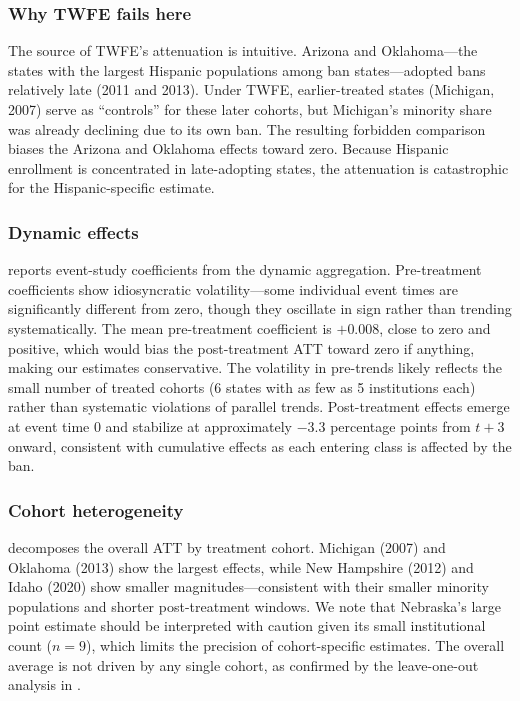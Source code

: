 \documentclass[12pt]{article}
\begin{document}


\subsubsection*{Why TWFE fails here} The source of TWFE's attenuation is intuitive. Arizona and Oklahoma---the states with the largest Hispanic populations among ban states---adopted bans relatively late (2011 and 2013). Under TWFE, earlier-treated states (Michigan, 2007) serve as ``controls'' for these later cohorts, but Michigan's minority share was already declining due to its own ban. The resulting forbidden comparison biases the Arizona and Oklahoma effects toward zero. Because Hispanic enrollment is concentrated in late-adopting states, the attenuation is catastrophic for the Hispanic-specific estimate.

\subsubsection*{Dynamic effects}  reports event-study coefficients from the dynamic aggregation. Pre-treatment coefficients show idiosyncratic volatility---some individual event times are significantly different from zero, though they oscillate in sign rather than trending systematically. The mean pre-treatment coefficient is $+0.008$, close to zero and positive, which would bias the post-treatment ATT toward zero if anything, making our estimates conservative. The volatility in pre-trends likely reflects the small number of treated cohorts (6 states with as few as 5 institutions each) rather than systematic violations of parallel trends. Post-treatment effects emerge at event time 0 and stabilize at approximately $-3.3$ percentage points from $t+3$ onward, consistent with cumulative effects as each entering class is affected by the ban.



\subsubsection*{Cohort heterogeneity}  decomposes the overall ATT by treatment cohort. Michigan (2007) and Oklahoma (2013) show the largest effects, while New Hampshire (2012) and Idaho (2020) show smaller magnitudes---consistent with their smaller minority populations and shorter post-treatment windows. We note that Nebraska's large point estimate should be interpreted with caution given its small institutional count ($n = 9$), which limits the precision of cohort-specific estimates. The overall average is not driven by any single cohort, as confirmed by the leave-one-out analysis in .
\end{document}
